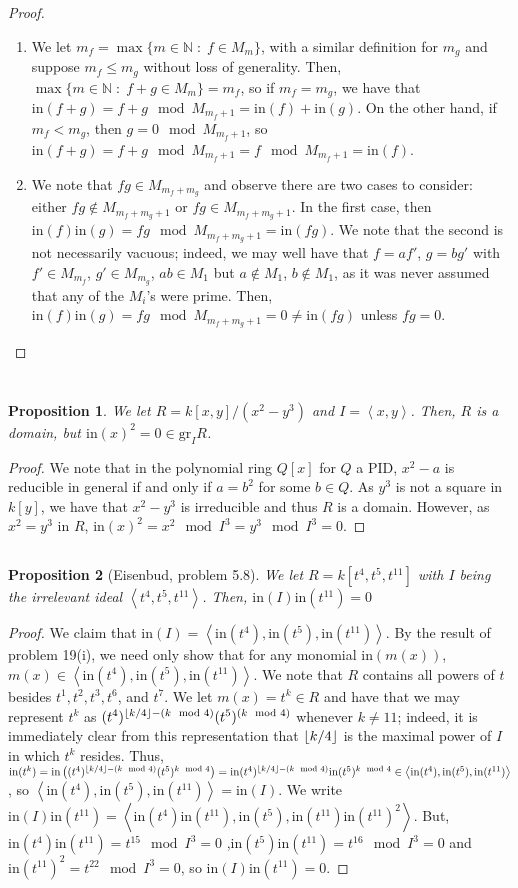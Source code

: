 \documentclass[english]{article}
\newcommand{\NN}{\mathbb{N}}
\newcommand{\prob}[1]{\setcounter{section}{#1-1}\section{}}
\newcommand{\prt}[1]{\setcounter{subsection}{#1-1}\subsection{}}
\DeclarePairedDelimiter\floor{\lfloor}{\rfloor}
\newtheorem*{prop*}{Proposition}
\theoremstyle{remark}
\theoremstyle{definition}
\newcommand{\gr}{\mathrm{gr}}
\newcommand{\ins}{\mathrm{in}}
\newcommand{\idl}[1]{\left\langle{#1}\right\rangle }
\begin{document}
\begin{proof}
	\begin{enumerate}[label=\emph{(\roman*)}]
		\item We let $m_f=\max\{m\in \NN\;:\; f\in M_m\}$, with a similar definition for $m_g$ and suppose $m_f\leq m_g$ without loss of generality. Then, $\max\{m\in \NN\;:\; f+g\in M_m\}=m_f$, so if $m_f=m_g$, we have that $\ins (f+g)=f+g\mod M_{m_f+1}=\ins(f)+\ins(g)$. On the other hand, if $m_f<m_g$, then $g=0\mod M_{m_f+1}$, so $\ins(f+g)=f+g\mod M_{m_f+1}=f\mod M_{m_f+1}=\ins(f)$.
		\item We note that $fg\in M_{m_f+m_g}$ and observe there are two cases to consider: either $fg\notin M_{m_f+m_g+1}$ or $fg\in M_{m_f+m_g+1}$. In the first case, then $\ins(f)\ins(g)=fg\mod M_{m_f+m_g+1}=\ins(fg)$. We note that the second is not necessarily vacuous; indeed, we may well have that $f=af'$, $g=bg'$ with $f'\in M_{m_f}$, $g'\in M_{m_g}$, $ab\in M_1$ but $a\notin M_1$, $b\notin M_1$, as it was never assumed that any of the $M_i$'s were prime. Then, $\ins(f)\ins(g)=fg\mod M_{m_f+m_g+1}=0\neq \ins(fg)$ unless $fg=0$.
	\end{enumerate}
\end{proof}
\prob{20}
\prt{1}\begin{prop*}
We let $R=k[x,y]/(x^2-y^3)$ and $I=\idl{x,y}$. Then, $R$ is a domain, but $\ins(x)^2=0\in \gr_IR$. 
\end{prop*}
\begin{proof}
	We note that in the polynomial ring $Q[x]$ for $Q$ a PID, $x^2-a$ is reducible in general if and only if $a=b^2$ for some $b\in Q$. As $y^3$ is not a square in $k[y]$, we have that $x^2-y^3$ is irreducible and thus $R$ is a domain. However, as $x^2=y^3$ in $R$, $\ins(x)^2=x^2\mod I^3=y^3\mod I^3=0$. 
\end{proof}
\prt{2}
\begin{prop*}[Eisenbud, problem 5.8]
	We let $R=k[t^4,t^5,t^{11}]$ with $I$ being the irrelevant ideal $\idl{t^4,t^5,t^{11}}$. Then, $\ins(I)\ins(t^{11})=0$
\end{prop*}
\begin{proof}
	We claim that $\ins(I)=\idl{\ins(t^4),\ins(t^5),\ins(t^{11})}$. By the result of problem 19(i), we need only show that for any monomial $\ins{(m(x))}$, $m(x)\in\idl{\ins(t^4),\ins(t^5),\ins(t^{11})}$. We note that $R$ contains all powers of $t$ besides $t^1,t^2,t^3,t^6$, and $t^7$. We let $m(x)=t^k\in R$ and have that we may represent $t^k$ as $(t^4)^{\floor{k/4}-(k\mod 4)}(t^5)^{(k\mod 4)}$ whenever $k\neq 11$; indeed, it is immediately clear from this representation that $\floor{k/4}$ is the maximal power of $I$ in which $t^k$ resides. Thus, $\ins(t^k)=\ins\left((t^4)^{\floor{k/4}-(k\mod 4)}(t^5)^{k\mod 4}\right)=\ins(t^4)^{\floor{k/4}-(k\mod 4)}\ins(t^5)^{k\mod 4}\in\idl{\ins(t^4),\ins(t^5),\ins(t^{11})}$, so $\idl{\ins(t^4),\ins(t^5),\ins(t^{11})}=\ins(I)$. We write $\ins(I)\ins(t^{11})=\idl{\ins(t^4)\ins(t^{11}),\ins(t^5),\ins(t^{11})\ins(t^{11})^2}$. But, $\ins(t^4)\ins(t^{11})=t^{15}\mod I^3=0$ ,$\ins(t^5)\ins(t^{11})=t^{16}\mod I^3=0$ and $\ins(t^{11})^2=t^{22}\mod I^3=0$, so $\ins(I)\ins(t^{11})=0$. 
\end{proof}
\end{document}
